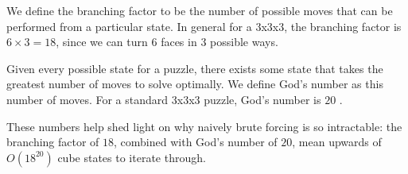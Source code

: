 \documentclass{article}
\begin{document}





We define the branching factor to be the number of possible moves that can be performed from a particular state. In general for a 3x3x3, the branching factor is $6 \times 3 = 18$, since we can turn $6$ faces in $3$ possible ways.

Given every possible state for a puzzle, there exists some state that takes the greatest number of moves to solve optimally. We define God's number as this number of moves. For a standard 3x3x3 puzzle, God's number is $20$ \cite{god}. 

These numbers help shed light on why naively brute forcing is so intractable: the branching factor of $18$, combined with God's number of $20$, mean upwards of $O(18^{20})$ cube states to iterate through.
\end{document}
